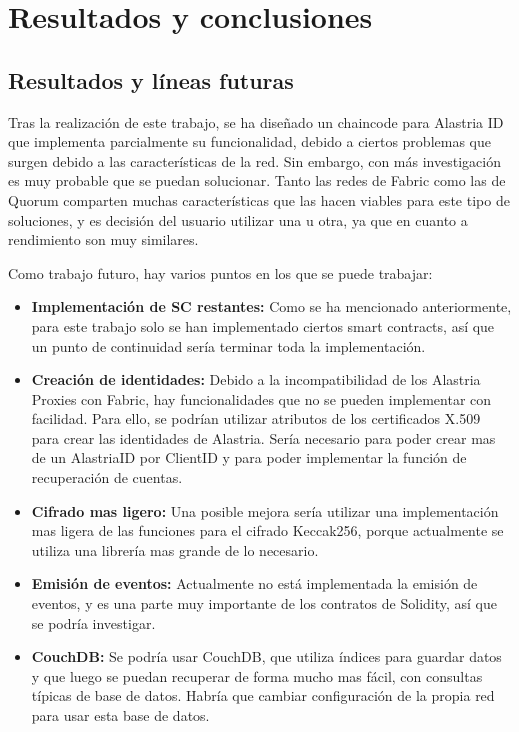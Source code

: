 \chapter{Resultados y conclusiones}
\section{Resultados y líneas futuras}
Tras la realización de este trabajo, se ha diseñado un chaincode para Alastria ID que implementa parcialmente su funcionalidad, debido a ciertos problemas que surgen debido a las características de la red. Sin embargo, con más investigación es muy probable que se puedan solucionar. Tanto las redes de Fabric como las de Quorum comparten muchas características que las hacen viables para este tipo de soluciones, y es decisión del usuario utilizar una u otra, ya que en cuanto a rendimiento son muy similares.

Como trabajo futuro, hay varios puntos en los que se puede trabajar:
\begin{itemize}
    \item \textbf{Implementación de SC restantes:} Como se ha mencionado anteriormente, para este trabajo solo se han implementado ciertos smart contracts, así que un punto de continuidad sería terminar toda la implementación.
    \item \textbf{Creación de identidades:} Debido a la incompatibilidad de los Alastria Proxies con Fabric, hay funcionalidades que no se pueden implementar con facilidad. Para ello, se podrían utilizar atributos de los certificados X.509 para crear las identidades de Alastria. Sería necesario para poder crear mas de un AlastriaID por ClientID y para poder implementar la función de recuperación de cuentas.
    \item \textbf{Cifrado mas ligero:} Una posible mejora sería utilizar una implementación mas ligera de las funciones para el cifrado Keccak256, porque actualmente se utiliza una librería mas grande de lo necesario.
    \item \textbf{Emisión de eventos:} Actualmente no está implementada la emisión de eventos, y es una parte muy importante de los contratos de Solidity, así que se podría investigar.
    \item \textbf{CouchDB:} Se podría usar CouchDB, que utiliza índices para guardar datos y que luego se puedan recuperar de forma mucho mas fácil, con consultas típicas de base de datos. Habría que cambiar configuración de la propia red para usar esta base de datos.
\end{itemize}
\clearpage
